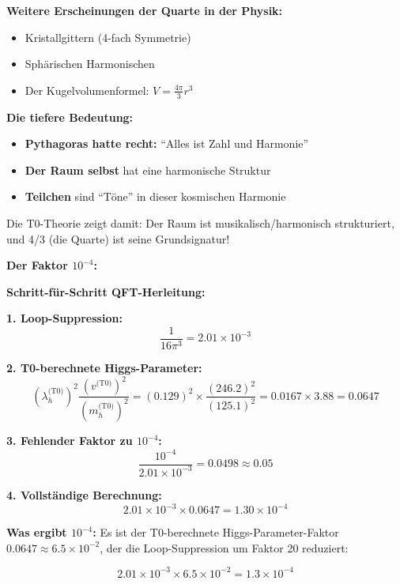 \documentclass[12pt,a4paper]{article}
\theoremstyle{definition}
\begin{document}
\textbf{Weitere Erscheinungen der Quarte in der Physik:}
\begin{itemize}
	\item Kristallgittern (4-fach Symmetrie)
	\item Sph\"arischen Harmonischen
	\item Der Kugelvolumenformel: $V = \frac{4\pi}{3}r^3$
\end{itemize}

\textbf{Die tiefere Bedeutung:}
\begin{itemize}
	\item \textbf{Pythagoras hatte recht:} ``Alles ist Zahl und Harmonie''
	\item \textbf{Der Raum selbst} hat eine harmonische Struktur
	\item \textbf{Teilchen} sind ``T\"one'' in dieser kosmischen Harmonie
\end{itemize}

Die T0-Theorie zeigt damit: Der Raum ist musikalisch/harmonisch strukturiert, und 4/3 (die Quarte) ist seine Grundsignatur!

\textbf{Der Faktor $10^{-4}$:}

\textbf{Schritt-für-Schritt QFT-Herleitung:}

\textbf{1. Loop-Suppression:}
\begin{equation}
	\frac{1}{16\pi^3} = 2.01 \times 10^{-3}
\end{equation}

\textbf{2. T0-berechnete Higgs-Parameter:}
\begin{equation}
	(\lambda_h^{\text{(T0)}})^2 \frac{(v^{\text{(T0)}})^2}{(m_h^{\text{(T0)}})^2} = (0.129)^2 \times \frac{(246.2)^2}{(125.1)^2} = 0.0167 \times 3.88 = 0.0647
\end{equation}

\textbf{3. Fehlender Faktor zu $10^{-4}$:}
\begin{equation}
	\frac{10^{-4}}{2.01 \times 10^{-3}} = 0.0498 \approx 0.05
\end{equation}

\textbf{4. Vollständige Berechnung:}
\begin{equation}
	2.01 \times 10^{-3} \times 0.0647 = 1.30 \times 10^{-4}
\end{equation}

\textbf{Was ergibt $10^{-4}$:}
Es ist der T0-berechnete Higgs-Parameter-Faktor $0.0647 \approx 6.5 \times 10^{-2}$, der die Loop-Suppression um Faktor 20 reduziert:

\begin{equation}
	2.01 \times 10^{-3} \times 6.5 \times 10^{-2} = 1.3 \times 10^{-4}
\end{equation}
\end{document}
